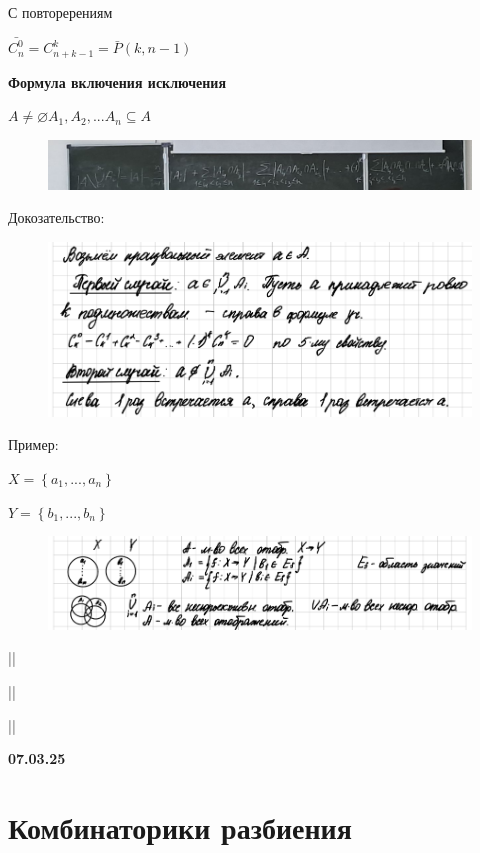 \documentclass{article}
\begin{document}
\vspace{5mm}

С повторерениям 

$\bar{C_{n}^{0}} = C_{n+k-1}^{k} = \bar{P}(k,n-1)$


\textbf{Формула включения исключения}

$A \neq \varnothing A_1, A_2,...A_n \subseteq A$

\begin{figure}[H]
    \centering
    \includegraphics[width=1\linewidth]
    {12c36b33-baa5-41a2-b016-b02e7ad225c8.jpg}
\end{figure}

Докозательство:

\begin{figure}[H]
    \centering
    \includegraphics[width=1\linewidth]{Снимок экрана 2025-02-21 145919.png}
\end{figure}

Пример:

$X=\left\{a_1,...,a_n \right\}$

$Y=\left\{b_1,...,b_n\right\}$


\begin{figure}[H]
    \centering
    \includegraphics[width=1\linewidth]{Снимок экрана 2025-02-21 150506.png}
\end{figure}

||

||

||


\textbf{07.03.25}
\section{Комбинаторики разбиения}
\end{document}
